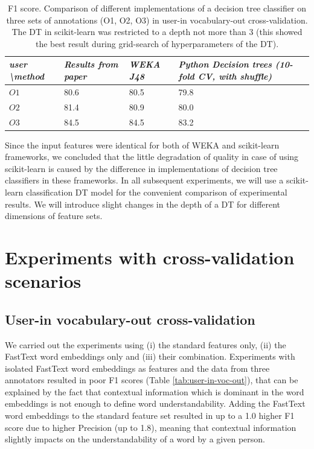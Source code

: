\begin{table}[h]
\begin{tabular}{L|LLL}
\hline
\textit{user \textbackslash method} & \textit{Results from paper \citep{Grabar-PITR2014}} & \textit{WEKA J48} & \textit{Python Decision trees (10-fold CV, with shuffle)} \\ \hline
$O1$ & 80.6 & 80.5 & 79.8 \\
$O2$ & 81.4 & 80.9 & 80.0 \\
$O3$ & 84.5 & 84.5 & 83.2 \\ \hline
\end{tabular}
    \caption{F1 score. Comparison of different implementations of a decision tree classifier on three sets of annotations (O1, O2, O3) in user-in vocabulary-out cross-validation. The DT in scikit-learn was restricted to a depth not more than 3 (this showed the best result during grid-search of hyperparameters of the DT).}
    \label{tab:results-reproduction}
\end{table}

Since the input features were identical for both of WEKA and scikit-learn frameworks, we concluded that the little degradation of quality in case of using scikit-learn is caused by the difference in implementations of decision tree classifiers in these frameworks. In all subsequent experiments, we will use a scikit-learn classification DT model for the convenient comparison of experimental results. We will introduce slight changes in the depth of a DT for different dimensions of feature sets.


\section{Experiments with cross-validation scenarios}
\label{sec:cv-experiments}
\subsection{User-in vocabulary-out cross-validation}

We carried out the experiments using (i) the standard features only, (ii) the FastText word embeddings only and (iii) their combination. Experiments with isolated FastText word embeddings as features and the data from three annotators resulted in poor F1 scores (Table \ref{tab:user-in-voc-out}), that can be explained by the fact that contextual information which is dominant in the word embeddings is not enough to define word understandability. Adding the FastText word embeddings to the standard feature set resulted in up to a 1.0 higher F1 score due to higher Precision (up to 1.8), meaning that contextual information slightly impacts on the understandability of a word by a given person.

